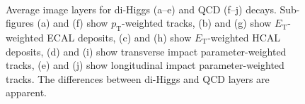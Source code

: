 \begin{figure}[!h]
\begin{center}
   \\
\caption{Average image layers for di-Higgs (a--e) and QCD (f--j) decays. Sub-figures (a) and (f) show $p_{\textrm{T}}$-weighted tracks, (b) and (g) show $E_{\textrm{T}}$-weighted ECAL deposits, (c) and (h) show $E_{\textrm{T}}$-weighted HCAL deposits, (d) and (i) show transverse impact parameter-weighted tracks, (e) and (j) show longitudinal impact parameter-weighted tracks. The differences between di-Higgs and QCD layers are apparent.}
\end{center}
\label{fig:cnn_avgImages}
\end{figure}

